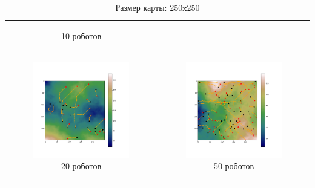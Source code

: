 \documentclass{article}
\numberwithin{equation}{section}
\begin{document}
\begin{table}[H]
\begin{tabular}{c c}
\begin{subfigure}{0.5\linewidth}
			\caption*{10 роботов}
			\end{subfigure}
			\\
            \begin{subfigure}{0.5\linewidth}
				\includegraphics[width = 1.0\columnwidth]{data/mean_paths/250x250/20.png}
			\caption*{20 роботов}
			\end{subfigure}
			&
			\begin{subfigure}{0.5\linewidth}
				\includegraphics[width = 1.0\columnwidth]{data/mean_paths/250x250/50.png}
			\caption*{50 роботов}
			\end{subfigure}
        \end{tabular}
        \caption*{Размер карты: 250x250}
	\end{table}
\end{document}
